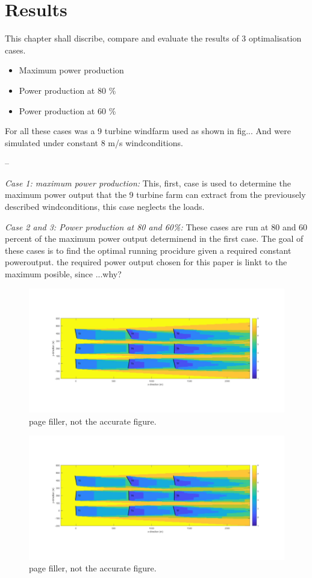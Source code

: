 \section{Results}

This chapter shall discribe, compare and evaluate the results of 3 optimalisation cases. 
\begin{itemize}
	\item Maximum power production
	\item Power production at 80 \% 
	\item Power production at 60 \% 
\end{itemize}
For all these cases was a 9 turbine windfarm used as shown in fig... And were simulated under constant 8 m/s windconditions.

  --
 
 
 \textit{Case 1: maximum power production: }
 This, first, case is used to determine the maximum power output that the 9 turbine farm can extract from the previousely described windconditions, this case neglects the loads.
 

 \textit{Case 2 and 3: Power production at 80 and 60\%: }
 These cases are run at 80 and 60 percent of the maximum power output determinend in the first case. The goal of these cases is to find the optimal running procidure given a required constant poweroutput. the required power output chosen for this paper is linkt to the maximum posible, since ...why? 
 



\begin{figure}
	\includegraphics[width=\linewidth]{./Figures/plotje.png}
	\caption{page filler, not the accurate figure.}
	\label{fig:case1turbs}
\end{figure}

	\begin{figure}
	\includegraphics[width=\linewidth]{./Figures/plotje.png}
	\caption{page filler, not the accurate figure.}
	\label{fig:case2turbs}
\end{figure}

